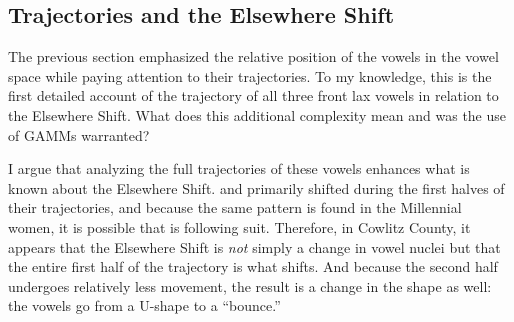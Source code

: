 \subsection{Trajectories and the Elsewhere Shift}
\label{sec:trajs_and_elsewhere_shift}

The previous section emphasized the relative position of the vowels in the vowel space while paying attention to their trajectories. To my knowledge, this is the first detailed account of the trajectory of all three front lax vowels in relation to the Elsewhere Shift. What does this additional complexity mean and was the use of GAMMs warranted?

I argue that analyzing the full trajectories of these vowels enhances what is known about the Elsewhere Shift. \bat and \bet primarily shifted during the first halves of their trajectories, and because the same pattern is found in the Millennial women, it is possible that \bit is following suit. Therefore, in Cowlitz County, it appears that the Elsewhere Shift is \textit{not} simply a change in vowel nuclei but that the entire first half of the trajectory is what shifts. And because the second half undergoes relatively less movement, the result is a change in the shape as well: the vowels go from a U-shape to a ``bounce.''


